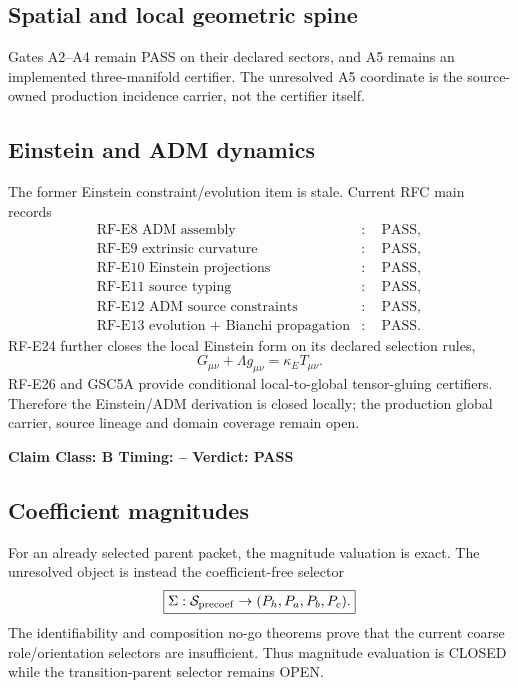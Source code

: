 \documentclass[11pt,a4paper,twoside]{book}
\theoremstyle{definition}
\newcommand{\vTwelveStatus}[3]{\par\noindent\textbf{Claim Class: #1 \quad Timing: #2 \quad Verdict: #3}\par}
\begin{document}
\subsection{Spatial and local geometric spine}

Gates A2--A4 remain PASS on their declared sectors, and A5 remains an
implemented three-manifold certifier. The unresolved A5 coordinate is the
source-owned production incidence carrier, not the certifier itself.

\subsection{Einstein and ADM dynamics}

The former Einstein constraint/evolution item is stale. Current RFC main records
\[
\boxed{
\begin{aligned}
\text{RF-E8 ADM assembly} &:\quad \mathrm{PASS},\\
\text{RF-E9 extrinsic curvature} &:\quad \mathrm{PASS},\\
\text{RF-E10 Einstein projections} &:\quad \mathrm{PASS},\\
\text{RF-E11 source typing} &:\quad \mathrm{PASS},\\
\text{RF-E12 ADM source constraints} &:\quad \mathrm{PASS},\\
\text{RF-E13 evolution + Bianchi propagation} &:\quad \mathrm{PASS}.
\end{aligned}}
\]
RF-E24 further closes the local Einstein form on its declared selection rules,
\[
\boxed{
G_{\mu\nu}+\Lambda g_{\mu\nu}
=\kappa_E T_{\mu\nu}.
}
\]
RF-E26 and GSC5A provide conditional local-to-global tensor-gluing certifiers.
Therefore the Einstein/ADM derivation is closed locally; the production global
carrier, source lineage and domain coverage remain open.
\vTwelveStatus{B}{--}{PASS}

\subsection{Coefficient magnitudes}

For an already selected parent packet, the magnitude valuation is exact.
The unresolved object is instead the coefficient-free selector
\[
\boxed{
\Sigma:\mathcal S_{\rm precoef}\to(P_h,P_a,P_b,P_c).
}
\]
The identifiability and composition no-go theorems prove that the current coarse
role/orientation selectors are insufficient. Thus magnitude evaluation is
CLOSED while the transition-parent selector remains OPEN.
\end{document}
